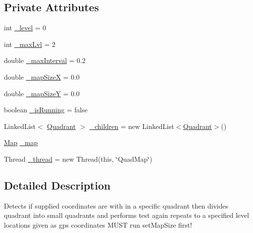 \subsection*{Private Attributes}
\begin{DoxyCompactItemize}
\item 
int \hyperlink{classrob_o_s2_1_1mapping_1_1quad_map_1_1_quad_map_a9f24ffcc536cedcc6f9b7412d716c516}{\_\-level} = 0
\item 
int \hyperlink{classrob_o_s2_1_1mapping_1_1quad_map_1_1_quad_map_a944ce3b32759689afbafe7c58737e852}{\_\-maxLvl} = 2
\item 
double \hyperlink{classrob_o_s2_1_1mapping_1_1quad_map_1_1_quad_map_ad167b359063c6de323b09cce45d6f6c3}{\_\-maxInterval} = 0.2
\item 
double \hyperlink{classrob_o_s2_1_1mapping_1_1quad_map_1_1_quad_map_ab3ab527c4fa6bf6772168dd17b1319ec}{\_\-mapSizeX} = 0.0
\item 
double \hyperlink{classrob_o_s2_1_1mapping_1_1quad_map_1_1_quad_map_a456395906e38ca89d316332d00bc453c}{\_\-mapSizeY} = 0.0
\item 
boolean \hyperlink{classrob_o_s2_1_1mapping_1_1quad_map_1_1_quad_map_add1eeff613fb12f79b183939a3bef983}{\_\-isRunning} = false
\item 
LinkedList$<$ \hyperlink{classrob_o_s2_1_1mapping_1_1quad_map_1_1_quadrant}{Quadrant} $>$ \hyperlink{classrob_o_s2_1_1mapping_1_1quad_map_1_1_quad_map_afa3d61b3214d5673b2760adbab9979f3}{\_\-children} = new LinkedList$<$\hyperlink{classrob_o_s2_1_1mapping_1_1quad_map_1_1_quadrant}{Quadrant}$>$()
\item 
\hyperlink{classrob_o_s2_1_1mapping_1_1quad_map_1_1_map}{Map} \hyperlink{classrob_o_s2_1_1mapping_1_1quad_map_1_1_quad_map_a089973d65aee27b607e5d9a3d3752f71}{\_\-map}
\item 
Thread \hyperlink{classrob_o_s2_1_1mapping_1_1quad_map_1_1_quad_map_a077771c6c78e2c1419df398b50aa4c81}{\_\-thread} = new Thread(this, \char`\"{}QuadMap\char`\"{})
\end{DoxyCompactItemize}


\subsection{Detailed Description}
Detects if supplied coordinates are with in a specific quadrant then divides quadrant into small quadrants and performs test again repeats to a specified level locations given as gps coordinates MUST run setMapSize first!

